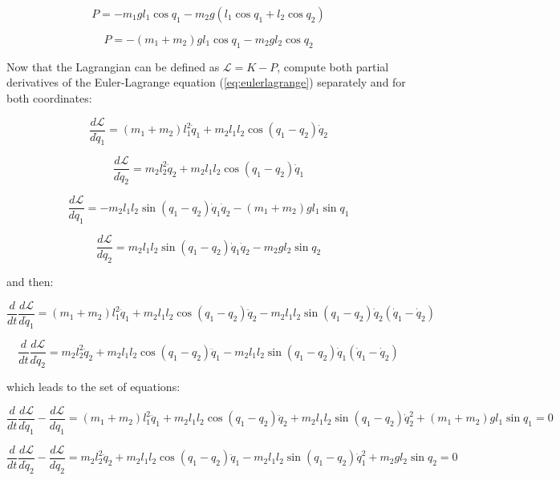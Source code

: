 \begin{equation*}
    P = - m_1 g l_1 \cos{q_1} - m_2 g (l_1 \cos{q_1} + l_2 \cos{q_2})
\end{equation*}

\begin{equation}
    P = - (m_1 + m_2) g l_1 \cos{q_1} - m_2 g l_2 \cos{q_2}
    \label{eq:doublependulumpotential}
\end{equation}

Now that the Lagrangian can be defined as $\mathcal{L} = K - P$, compute both partial derivatives of the Euler-Lagrange equation (\ref{eq:eulerlagrange}) separately and for both coordinates:

$$
\frac{d \mathcal{L}}{d \dot{q}_1} = (m_1 + m_2) l_1^2 \dot{q}_1 + m_2 l_1 l_2 \cos(q_1 - q_2) \dot{q}_2
$$

$$
\frac{d \mathcal{L}}{d \dot{q}_2} = m_2 l_2^2 \dot{q}_2 + m_2 l_1 l_2 \cos(q_1 - q_2) \dot{q}_1
$$

$$
\frac{d \mathcal{L}}{d q_1} = - m_2 l_1 l_2 \sin(q_1 - q_2) \dot{q}_1 \dot{q}_2 - (m_1 + m_2) g l_1 \sin{q_1}
$$

$$
\frac{d \mathcal{L}}{d q_2} = m_2 l_1 l_2 \sin(q_1 - q_2) \dot{q}_1 \dot{q}_2 - m_2 g l_2 \sin{q_2}
$$

\noindent and then:

$$
\frac{d}{d t} \frac{d \mathcal{L}}{d \dot{q}_1} = (m_1 + m_2) l_1^2 \ddot{q}_1 + m_2 l_1 l_2 \cos(q_1 - q_2) \ddot{q}_2 - m_2 l_1 l_2 \sin(q_1 - q_2) \dot{q}_2 (\dot{q}_1 - \dot{q}_2)
$$

$$
\frac{d}{d t} \frac{d \mathcal{L}}{d \dot{q}_2} = m_2 l_2^2 \ddot{q}_2 + m_2 l_1 l_2 \cos(q_1 - q_2) \ddot{q}_1 - m_2 l_1 l_2 \sin(q_1 - q_2) \dot{q}_1 (\dot{q}_1 - \dot{q}_2)
$$

\noindent which leads to the set of equations:

\begin{equation*}
\frac{d}{d t} \frac{d \mathcal{L}}{d \dot{q}_1} - \frac{d \mathcal{L}}{d q_1}
= (m_1 + m_2) l_1^2 \ddot{q}_1 + m_2 l_1 l_2 \cos(q_1 - q_2) \ddot{q}_2 + m_2 l_1 l_2 \sin(q_1 - q_2) \dot{q}_2^2 + (m_1 + m_2) g l_1 \sin{q_1}
= 0
\end{equation*}

\begin{equation*}
\frac{d}{d t} \frac{d \mathcal{L}}{d \dot{q}_2} - \frac{d \mathcal{L}}{d q_2}
= m_2 l_2^2 \ddot{q}_2 + m_2 l_1 l_2 \cos(q_1 - q_2) \ddot{q}_1 - m_2 l_1 l_2 \sin(q_1 - q_2) \dot{q}_1^2 + m_2 g l_2 \sin{q_2}
= 0
\end{equation*}

